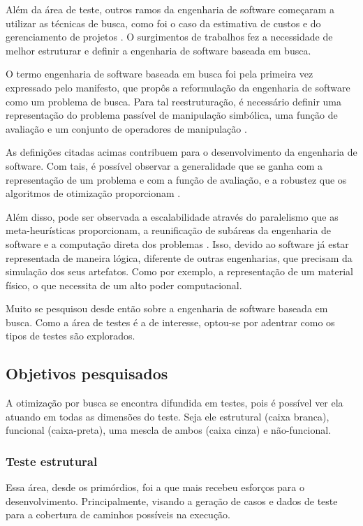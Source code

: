 Além da área de teste, outros ramos da engenharia de software começaram a
utilizar as técnicas de busca, como foi o caso da estimativa de custos e do
gerenciamento de projetos \cite{de2011ten}. O surgimentos de trabalhos fez a
necessidade de melhor estruturar e definir a engenharia de software baseada em
busca.

O termo engenharia de software baseada em busca foi pela primeira vez expressado
pelo manifesto, que propôs a reformulação da engenharia de software como um
problema de busca. Para tal reestruturação, é necessário definir uma
representação do problema passível de manipulação simbólica, uma função de
avaliação e um conjunto de operadores de manipulação \cite{harman2001search}.

As definições citadas acimas contribuem para o desenvolvimento da engenharia de
software. Com tais, é possível observar a generalidade que se ganha com a
representação de um problema e com a função de avaliação, e a robustez que os
algoritmos de otimização proporcionam \cite{harman2012search}. 

Além disso, pode ser observada a escalabilidade através do paralelismo que as
meta-heurísticas proporcionam, a reunificação de subáreas da engenharia de
software e a computação direta dos problemas \cite{harman2012search}. Isso,
devido ao software já estar representada de maneira lógica, diferente de outras
engenharias, que precisam da simulação dos seus artefatos. Como por exemplo, a
representação de um material físico, o que necessita de um alto poder
computacional.

Muito se pesquisou desde então sobre a engenharia de software baseada em busca.
Como a área de testes é a de interesse, optou-se por adentrar como os tipos de
testes são explorados.

\subsection{Objetivos pesquisados}

A otimização por busca se encontra difundida em testes, pois é possível ver ela
atuando em todas as dimensões do teste. Seja ele estrutural (caixa branca),
funcional (caixa-preta), uma mescla de ambos (caixa cinza) e não-funcional.

\subsubsection{Teste estrutural}

Essa área, desde os primórdios, foi a que mais recebeu esforços para o
desenvolvimento. Principalmente, visando a geração de casos e dados de teste
para a cobertura de caminhos possíveis na execução. 

